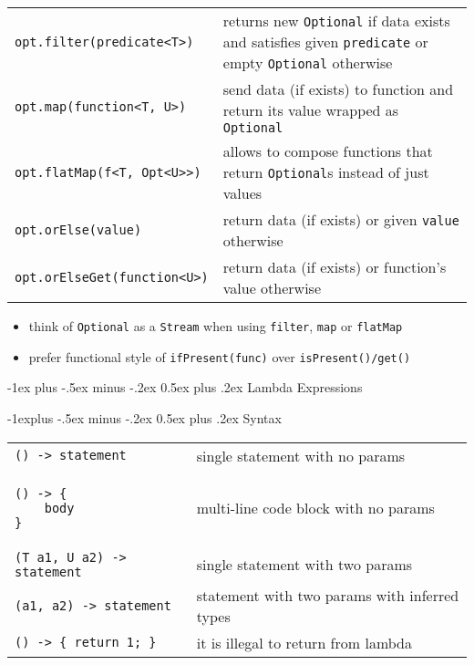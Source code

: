 \documentclass[10pt,landscape]{article}
\makeatletter
\renewcommand{\section}{\@startsection{section}{1}{0mm}%
                                {-1ex plus -.5ex minus -.2ex}%
                                {0.5ex plus .2ex}%
                                {\normalfont\large\bfseries}}
\renewcommand{\subsection}{\@startsection{subsection}{2}{0mm}%
                                {-1explus -.5ex minus -.2ex}%
                                {0.5ex plus .2ex}%
                                {\normalfont\normalsize\bfseries}}
\makeatother
\begin{document}
\begin{multicols}{2}
\begin{tabular}{@{}m{\the\DefaultColLen}@{}m{\linewidth-\the\DefaultColLen}@{}}
\verb!opt.filter(predicate<T>)! & returns new \verb!Optional! if data exists and satisfies given \verb!predicate! or empty \verb!Optional! otherwise \\

\verb!opt.map(function<T, U>)! & send data (if exists) to function and return its value wrapped as \verb!Optional! \\

\verb!opt.flatMap(f<T, Opt<U>>)! & allows to compose functions that return \verb!Optional!s instead of just values \\

\verb!opt.orElse(value)! & return data (if exists) or given \verb!value! otherwise \\
\verb!opt.orElseGet(function<U>)! & return data (if exists) or function's value otherwise \\
\end{tabular}
\begin{itemize}
\item think of \verb!Optional! as a \verb!Stream! when using \verb!filter!, \verb!map! or \verb!flatMap!
\item prefer functional style of \verb!ifPresent(func)! over \verb!isPresent()/get()!
\end{itemize}





\section{Lambda Expressions}

\subsection{Syntax}
\begin{tabular}{@{}m{\the\DefaultColLen}@{}m{\linewidth-\the\DefaultColLen}@{}}
\verb!() -> statement! & single statement with no params \\
\begin{minipage}[t]{\linewidth}
\begin{verbatim}
() -> {
    body
}
\end{verbatim}
\end{minipage} & multi-line code block with no params\\
\verb!(T a1, U a2) -> statement! & single statement with two params \\
\verb!(a1, a2) -> statement! & statement with two params with inferred types\\
\verb!() -> { return 1; }! & it is illegal to return from lambda\\
\end{tabular}


\end{multicols}
\end{document}
